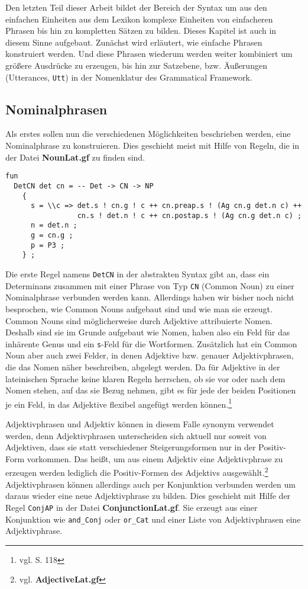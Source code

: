 Den letzten Teil dieser Arbeit bildet der Bereich der Syntax um aus den einfachen Einheiten aus dem Lexikon komplexe Einheiten von einfacheren Phrasen bis hin zu kompletten Sätzen zu bilden. Dieses Kapitel ist auch in diesem Sinne aufgebaut. Zunächst wird erläutert, wie einfache Phrasen konstruiert werden. Und diese Phrasen wiederum werden weiter kombiniert um größere Ausdrücke zu erzeugen, bis hin zur Satzebene, bzw. Äußerungen (Utterances, \texttt{Utt}) in der Nomenklatur des Grammatical Framework.
\subsection{Nominalphrasen}
\label{subsec:nominalphrasen}
Als erstes sollen nun die verschiedenen Möglichkeiten beschrieben werden, eine Nominalphrase zu konstruieren. Dies geschieht meist mit Hilfe von Regeln, die in der Datei \textbf{NounLat.gf} zu finden sind. \par
\begin{lstlisting}[float=h!tp,caption={Die Syntaxregel \texttt{DetCN}},label={GF-Noun-DetCN}]
fun
  DetCN det cn = -- Det -> CN -> NP
    {
      s = \\c => det.s ! cn.g ! c ++ cn.preap.s ! (Ag cn.g det.n c) ++ 
                 cn.s ! det.n ! c ++ cn.postap.s ! (Ag cn.g det.n c) ; 
      n = det.n ;  
      g = cn.g ; 
      p = P3 ;
    } ;
\end{lstlisting}
Die erste Regel namens \texttt{DetCN} in der abstrakten Syntax gibt an, dass ein Determinans zusammen mit einer Phrase von Typ \texttt{CN} (Common Noun) zu einer Nominalphrase verbunden werden kann. Allerdings haben wir bisher noch nicht besprochen, wie Common Nouns aufgebaut sind und wie man sie erzeugt. Common Nouns sind möglicherweise durch Adjektive attribuierte Nomen. Deshalb sind sie im Grunde aufgebaut wie Nomen, haben also ein Feld für das inhärente Genus und ein \texttt{s}-Feld für die Wortformen. Zusätzlich hat ein Common Noun aber auch zwei Felder, in denen Adjektive bzw. genauer Adjektivphrasen, die das Nomen näher beschreiben, abgelegt werden. Da für Adjektive in der lateinischen Sprache keine klaren Regeln herrschen, ob sie vor oder nach dem Nomen stehen, auf das sie Bezug nehmen, gibt es für jede der beiden Positionen je ein Feld, in das Adjektive flexibel angefügt werden können.\footnote{vgl. \cite{BAYER-LINDAUER1994} S. 118} \par
Adjektivphrasen und Adjektiv können in diesem Falle synonym verwendet werden, denn Adjektivphrasen unterscheiden sich aktuell nur soweit von Adjektiven, dass sie statt verschiedener Steigerungsformen nur in der Positiv-Form vorkommen. Das heißt, um aus einem Adjektiv eine Adjektivphrase zu erzeugen werden lediglich die Positiv-Formen des Adjektivs ausgewählt.\footnote{vgl. \textbf{AdjectiveLat.gf}} Adjektivphrasen können allerdings auch per Konjunktion verbunden werden um daraus wieder eine neue Adjektivphrase zu bilden. Dies geschieht mit Hilfe der Regel \texttt{ConjAP} in der Datei \textbf{ConjunctionLat.gf}. Sie erzeugt aus einer Konjunktion wie \texttt{and\_Conj} oder \texttt{or\_Cat} und einer Liste von Adjektivphrasen eine Adjektivphrase. \par
